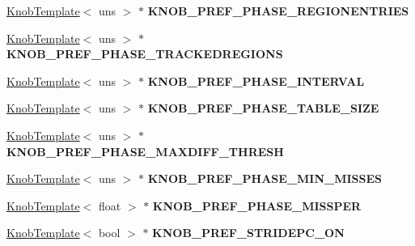 \begin{DoxyCompactItemize}
\item 
\hypertarget{classall__knobs__c_adb68ab4cb6220d7317c8037818039f6b}{
\hyperlink{classKnobTemplate}{KnobTemplate}$<$ uns $>$ $\ast$ {\bfseries KNOB\_\-PREF\_\-PHASE\_\-REGIONENTRIES}}
\label{classall__knobs__c_adb68ab4cb6220d7317c8037818039f6b}

\item 
\hypertarget{classall__knobs__c_a381071917fc5f01087f0852ae8eed7eb}{
\hyperlink{classKnobTemplate}{KnobTemplate}$<$ uns $>$ $\ast$ {\bfseries KNOB\_\-PREF\_\-PHASE\_\-TRACKEDREGIONS}}
\label{classall__knobs__c_a381071917fc5f01087f0852ae8eed7eb}

\item 
\hypertarget{classall__knobs__c_a0c614aae8700b99ec7d191150827a5dc}{
\hyperlink{classKnobTemplate}{KnobTemplate}$<$ uns $>$ $\ast$ {\bfseries KNOB\_\-PREF\_\-PHASE\_\-INTERVAL}}
\label{classall__knobs__c_a0c614aae8700b99ec7d191150827a5dc}

\item 
\hypertarget{classall__knobs__c_a0864b73c432f6f5772adeeb31212fd0f}{
\hyperlink{classKnobTemplate}{KnobTemplate}$<$ uns $>$ $\ast$ {\bfseries KNOB\_\-PREF\_\-PHASE\_\-TABLE\_\-SIZE}}
\label{classall__knobs__c_a0864b73c432f6f5772adeeb31212fd0f}

\item 
\hypertarget{classall__knobs__c_adb7f1fc521956660df941c2517ceeb05}{
\hyperlink{classKnobTemplate}{KnobTemplate}$<$ uns $>$ $\ast$ {\bfseries KNOB\_\-PREF\_\-PHASE\_\-MAXDIFF\_\-THRESH}}
\label{classall__knobs__c_adb7f1fc521956660df941c2517ceeb05}

\item 
\hypertarget{classall__knobs__c_af1a591b04a908e98b09cf4ec6f0d4d58}{
\hyperlink{classKnobTemplate}{KnobTemplate}$<$ uns $>$ $\ast$ {\bfseries KNOB\_\-PREF\_\-PHASE\_\-MIN\_\-MISSES}}
\label{classall__knobs__c_af1a591b04a908e98b09cf4ec6f0d4d58}

\item 
\hypertarget{classall__knobs__c_ac38bf8bf0d282d922fbc0ca38dd68351}{
\hyperlink{classKnobTemplate}{KnobTemplate}$<$ float $>$ $\ast$ {\bfseries KNOB\_\-PREF\_\-PHASE\_\-MISSPER}}
\label{classall__knobs__c_ac38bf8bf0d282d922fbc0ca38dd68351}

\item 
\hypertarget{classall__knobs__c_a107e9d2bf432f1225314b68a3d37df7c}{
\hyperlink{classKnobTemplate}{KnobTemplate}$<$ bool $>$ $\ast$ {\bfseries KNOB\_\-PREF\_\-STRIDEPC\_\-ON}}
\label{classall__knobs__c_a107e9d2bf432f1225314b68a3d37df7c}


\end{DoxyCompactItemize}
